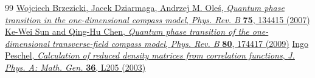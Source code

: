 \documentclass[12font]{article}
\theoremstyle{definition}
\numberwithin{equation}{section}
\begin{document}
\begin{thebibliography}{99}
    \href{https://doi.org/10.1103/PhysRevB.75.134415}{Wojciech Brzezicki, Jacek Dziarmaga, Andrzej M. Ole\'s, \emph{Quantum phase transition in the one-dimensional compass model}, \emph{Phys. Rev. B} \textbf{75}, 134415 (2007)}
    \href{https://doi.org/10.1103/PhysRevB.80.174417}{Ke-Wei Sun and Qing-Hu Chen, \emph{Quantum phase transition of the one-dimensional transverse-field compass model}, \emph{Phys. Rev. B} \textbf{80}, 174417 (2009)}
    \href{https://doi.org/10.1088/0305-4470/36/14/101}{Ingo Peschel, \emph{Calculation of reduced density matrices from correlation functions}, \emph{J. Phys. A: Math. Gen.} \textbf{36}, L205 (2003)}
\end{thebibliography}
\end{document}
